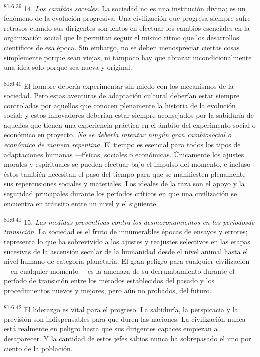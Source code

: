 \documentclass[twoside, 11pt]{book}
\begin{document}
\par
\textsuperscript{81:6.39} 14. \textit{Los cambios sociales}. La sociedad no es una institución divina; es un fenómeno de la evolución progresiva. Una civilización que progresa siempre sufre retrasos cuando sus dirigentes son lentos en efectuar los cambios esenciales en la organización social que le permitan seguir el mismo ritmo que los desarrollos científicos de esa época. Sin embargo, no se deben menospreciar ciertas cosas simplemente porque sean viejas, ni tampoco hay que abrazar incondicionalmente una idea sólo porque sea nueva y original.

\par
\textsuperscript{81:6.40} El hombre debería experimentar sin miedo con los mecanismos de la sociedad. Pero estas aventuras de adaptación cultural deberían estar siempre controladas por aquellos que conocen plenamente la historia de la evolución social; y estos innovadores deberían estar siempre aconsejados por la sabiduría de aquellos que tienen una experiencia práctica en el ámbito del experimento social o económico en proyecto. \textit{No se debería intentar ningún gran cambiosocial o económico de manera repentina}. El tiempo es esencial para todos los tipos de adaptaciones humanas ---físicas, sociales o económicas. Únicamente los ajustes morales y espirituales se pueden efectuar bajo el impulso del momento, e incluso éstos también necesitan el paso del tiempo para que se manifiesten plenamente sus repercusiones sociales y materiales. Los ideales de la raza son el apoyo y la seguridad principales durante los períodos críticos en que una civilización se encuentra en tránsito entre un nivel y el siguiente.

\par
\textsuperscript{81:6.41} 15. \textit{Las medidas preventivas contra los desmoronamientos en los períodosde transición}. La sociedad es el fruto de innumerables épocas de ensayos y errores; representa lo que ha sobrevivido a los ajustes y reajustes selectivos en las etapas sucesivas de la ascensión secular de la humanidad desde el nivel animal hasta el nivel humano de categoría planetaria. El gran peligro para cualquier civilización ---en cualquier momento--- es la amenaza de su derrumbamiento durante el período de transición entre los métodos establecidos del pasado y los procedimientos nuevos y mejores, pero aún no probados, del futuro.

\par
\textsuperscript{81:6.42} El liderazgo es vital para el progreso. La sabiduría, la perspicacia y la previsión son indispensables para que duren las naciones. La civilización nunca está realmente en peligro hasta que sus dirigentes capaces empiezan a desaparecer. Y la cantidad de estos jefes sabios nunca ha sobrepasado el uno por ciento de la población.
\end{document}
